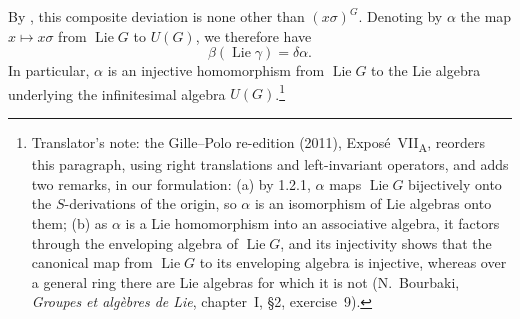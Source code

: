 By , this composite deviation is none other than
\((x\sigma)^G\). Denoting by \(\alpha\) the map \(x\mapsto x\sigma\)
from \(\operatorname{Lie}G\) to \(U(G)\), we therefore have
\[
  \beta(\operatorname{Lie}\gamma)=\delta\alpha.
\]
In particular, \(\alpha\) is an injective homomorphism from
\(\operatorname{Lie}G\) to the Lie algebra underlying the infinitesimal
algebra \(U(G)\).\footnote{Translator's note: the Gille--Polo re-edition
(2011), Expos\'e~VII\textsubscript{A}, reorders this paragraph, using
right translations and left-invariant operators, and adds two remarks,
in our formulation: (a) by 1.2.1, \(\alpha\) maps \(\operatorname{Lie}G\)
bijectively onto the \(S\)-derivations of the origin, so \(\alpha\) is an
isomorphism of Lie algebras onto them; (b) as \(\alpha\) is a Lie
homomorphism into an associative algebra, it factors through the
enveloping algebra of \(\operatorname{Lie}G\), and its injectivity shows
that the canonical map from \(\operatorname{Lie}G\) to its enveloping
algebra is injective, whereas over a general ring there are Lie algebras
for which it is not (N.~Bourbaki, \textit{Groupes et alg\`ebres de Lie},
chapter~I, \S2, exercise~9).}

